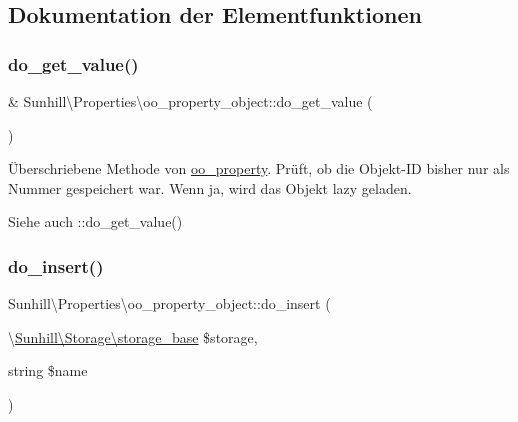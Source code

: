 \subsection{Dokumentation der Elementfunktionen}
\mbox{\label{classSunhill_1_1Properties_1_1oo__property__object_a8ea8708197f2460537589bf45a02da3c}} 
\subsubsection{\texorpdfstring{do\+\_\+get\+\_\+value()}{do\_get\_value()}}
{\footnotesize\ttfamily \& Sunhill\textbackslash{}\+Properties\textbackslash{}oo\+\_\+property\+\_\+object\+::do\+\_\+get\+\_\+value (\begin{DoxyParamCaption}{ }\end{DoxyParamCaption})\hspace{0.3cm}{\ttfamily [protected]}}

Überschriebene Methode von \hyperlink{classSunhill_1_1Properties_1_1oo__property}{oo\+\_\+property}. Prüft, ob die Objekt-\/\+ID bisher nur als Nummer gespeichert war. Wenn ja, wird das Objekt lazy geladen.  \begin{DoxySeeAlso}{Siehe auch}
\+::do\+\_\+get\+\_\+value() 
\end{DoxySeeAlso}
\mbox{\label{classSunhill_1_1Properties_1_1oo__property__object_ac97b532d8c0652030b7a2fef0cf28b01}} 
\subsubsection{\texorpdfstring{do\+\_\+insert()}{do\_insert()}}
{\footnotesize\ttfamily Sunhill\textbackslash{}\+Properties\textbackslash{}oo\+\_\+property\+\_\+object\+::do\+\_\+insert (\begin{DoxyParamCaption}\item[{\textbackslash{}\hyperlink{classSunhill_1_1Storage_1_1storage__base}{Sunhill\textbackslash{}\+Storage\textbackslash{}storage\+\_\+base}}]{\$storage,  }\item[{string}]{\$name }\end{DoxyParamCaption})\hspace{0.3cm}{\ttfamily [protected]}}


